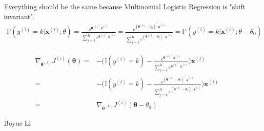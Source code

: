 \begin{enumerate}
    \fillwithlines{6em}
    
    \begin{soln}
    Everything should be the same because Multinomial Logistic Regression is "shift invariant".
        \begin{align*}
            \mathbb P(y^{(i)} = k \vert \mathbf x^{(i)}; \theta)
            = \frac {e^{{\mathbf \theta^{(k)}}^\top \mathbf x^{(i)}}} {\sum_{j=1}^{K} e^{{\mathbf \theta^{(j)}}^\top \mathbf x^{(i)}}}
            = \frac
            {e^{{(\mathbf \theta^{(k)} - \theta_0)}^\top \mathbf x^{(i)}}}
            {\sum_{j=1}^{K} e^{{(\mathbf \theta^{(j)} - \theta_0)}^\top \mathbf x^{(i)}}}
            =
            \mathbb P(y^{(i)} = k \vert \mathbf x^{(i)}; \theta - \theta_0)
        \end{align*}
        
        \begin{align*}
            \nabla_{\mathbf \theta^{(k)}} J^{(i)}(\mathbf \theta) = 
            & -\Big(
            \mathbb I (y^{(i)} = k)
            - \frac
                {e^{{\mathbf \theta^{(k)}}^\top \mathbf x^{(i)}}}
                {\sum_{j=1}^{K} e^{{\mathbf \theta^{(j)}}^\top \mathbf x^{(i)}}}
            \Big)
            \mathbf x^{(i)} \\
            =& -\Big(
            \mathbb I (y^{(i)} = k)
            - \frac
                {e^{{(\mathbf \theta^{(k)} - \theta_0)}^\top \mathbf x^{(i)}}}
                {\sum_{j=1}^{K} e^{{(\mathbf \theta^{(j)} - \theta_0)}^\top \mathbf x^{(i)}}}
            \Big)
            \mathbf x^{(i)} \\
            = &\nabla_{\mathbf \theta^{(k)}} J^{(i)}(\mathbf \theta - \theta_0)
        \end{align*}
    \end{soln}
    
    \begin{qauthor}
    Boyue Li
    \end{qauthor}
    
    
\end{enumerate}

